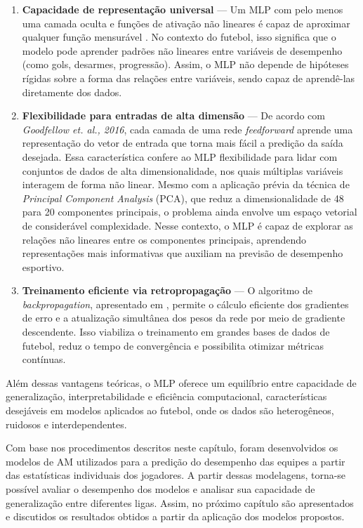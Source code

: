\begin{enumerate}
    \item \textbf{Capacidade de representação universal} —
    Um MLP com pelo menos uma camada oculta e funções de ativação não lineares é capaz de aproximar qualquer função mensurável \cite{Hornik1991}.
    No contexto do futebol, isso significa que o modelo pode aprender padrões não lineares entre variáveis de desempenho (como gols, desarmes, progressão). 
    Assim, o MLP não depende de hipóteses rígidas sobre a forma das relações entre variáveis, sendo capaz de aprendê-las diretamente dos dados.
    \item \textbf{Flexibilidade para entradas de alta dimensão} —
    De acordo com \textit{Goodfellow et. al., 2016}, cada camada de uma rede \textit{feedforward} aprende uma representação do vetor de entrada que torna 
    mais fácil a predição da saída desejada. 
    Essa característica confere ao MLP flexibilidade para lidar com conjuntos de dados de alta dimensionalidade, nos quais múltiplas variáveis interagem de forma não linear. 
    Mesmo com a aplicação prévia da técnica de \textit{Principal Component Analysis} (PCA), que reduz a dimensionalidade de 48 para 20 componentes principais, 
    o problema ainda envolve um espaço vetorial de considerável complexidade. 
    Nesse contexto, o MLP é capaz de explorar as relações não lineares entre os componentes principais, aprendendo representações 
    mais informativas que auxiliam na previsão de desempenho esportivo.
    \item \textbf{Treinamento eficiente via retropropagação} — 
    O algoritmo de \textit{backpropagation}, apresentado em \cite{Goodfellow2016}, permite o cálculo eficiente dos gradientes de erro e a atualização 
    simultânea dos pesos da rede por meio de gradiente descendente. 
    Isso viabiliza o treinamento em grandes bases de dados de futebol, reduz o tempo de convergência e possibilita otimizar métricas contínuas.
\end{enumerate}

Além dessas vantagens teóricas, o MLP oferece um equilíbrio entre capacidade de generalização, interpretabilidade e eficiência computacional, características 
desejáveis em modelos aplicados ao futebol, onde os dados são heterogêneos, ruidosos e interdependentes.

Com base nos procedimentos descritos neste capítulo, foram desenvolvidos os modelos de AM utilizados para a predição do desempenho das equipes a partir das 
estatísticas individuais dos jogadores. A partir dessas modelagens, torna-se possível avaliar o desempenho dos modelos e analisar sua capacidade de generalização 
entre diferentes ligas. Assim, no próximo capítulo são apresentados e discutidos os resultados obtidos a partir da aplicação dos modelos propostos.